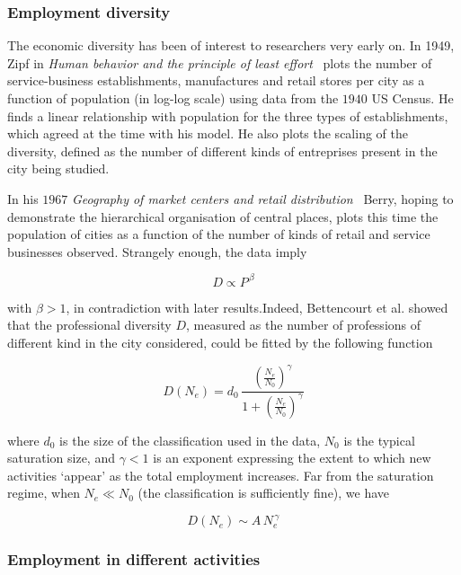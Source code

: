 \subsubsection{Employment diversity}
\label{ssub:employment_diversity}

The economic diversity has been of interest to researchers very early on. In
1949, Zipf in \emph{Human behavior and the principle of least
effort}~\cite{Zipf:1949} plots the number of service-business establishments, manufactures and
retail stores per city as a function of population (in log-log scale) using data
from the $1940$ US Census. He finds a linear relationship with population for
the three types of establishments, which agreed at the time with his model. He
also plots the scaling of the diversity, defined as the number of different kinds of
entreprises present in the city being studied. 

In his $1967$ \emph{Geography of market centers and retail
distribution}~\cite{Berry:1967} Berry, hoping to demonstrate the hierarchical
organisation of central places, plots this time the population of cities as a
function of the number of kinds of retail and service businesses observed.
Strangely enough, the data imply

\begin{equation}
    D \propto P^{\, \beta}
\end{equation}

with $\beta > 1$, in contradiction with later results.Indeed, Bettencourt et al.\cite{Bettencourt:2014} showed that the professional
diversity $D$, measured as the number of professions of different kind in the
city considered, could be fitted by the following function

\begin{equation}
    D(N_e) = d_0\, \frac{\left(\frac{N_e}{N_0}\right)^\gamma}{1+\left(\frac{N_e}{N_0}\right)^\gamma}
\end{equation}

where $d_0$ is the size of the classification used in the data, $N_0$ is the
typical saturation size, and $\gamma < 1$ is an exponent expressing the extent to
which new activities `appear' as the total employment increases. Far from the
saturation regime, when $N_e \ll N_0$ (the classification is sufficiently fine), we have 

\begin{equation}
    D(N_e) \sim A\,N_e^{\,\gamma}
\end{equation}

\subsubsection{Employment in different activities}
\label{ssub:employment_in_different_activities}

